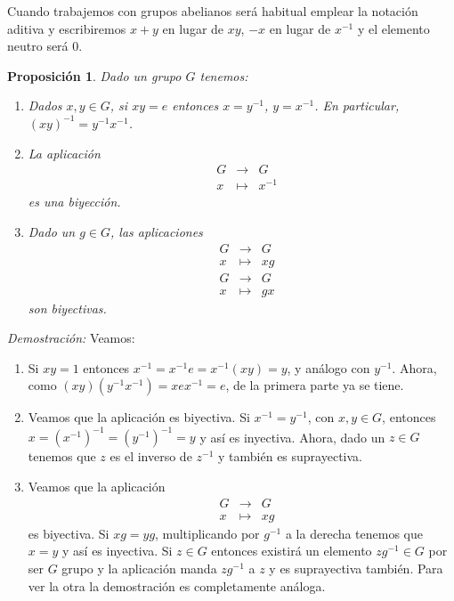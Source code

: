 \documentclass[12pt]{article}
\newtheorem{proposition}[theorem]{Proposición}
\begin{document}
Cuando trabajemos con grupos abelianos será habitual emplear la notación aditiva y escribiremos $x+y$ en lugar de $xy$, $-x$ en lugar de $x^{-1}$ y el elemento neutro será $0$.

\begin{proposition}\label{eq:primGrup} Dado un grupo $G$ tenemos:
\begin{enumerate}
\item Dados $x,y \in G$, si $xy = e$ entonces $x = y^{-1}$, $y = x^{-1}$. En particular, $(xy)^{-1} = y^{-1}x^{-1}$.
\item La aplicación $$\begin{array}{rccl}
&G&\longrightarrow &G\\
&x& \longmapsto &x^{-1}
\end{array}
$$ es una biyección.
\item Dado un $g \in G$, las aplicaciones $$\begin{array}{rccl}
&G&\longrightarrow &G\\
&x& \longmapsto &xg
\end{array}
$$
$$\begin{array}{rccl}
&G&\longrightarrow &G\\
&x& \longmapsto &gx
\end{array}
$$ son biyectivas.
\end{enumerate}
\end{proposition}
\emph{Demostración: }Veamos: \begin{enumerate}
\item Si $xy = 1$ entonces $x^{-1} = x^{-1}e= x^{-1}(xy) = y$, y análogo con $y^{-1}$. Ahora, como $(xy) (y^{-1}x^{-1})=xex^{-1} = e$, de la primera parte ya se tiene.
\item Veamos que la aplicación es biyectiva. Si $x^{-1} = y^{-1}$, con $x,y \in G$, entonces $x = (x^{-1})^{-1} = (y^{-1})^{-1}=y$ y así es inyectiva. Ahora, dado un $z \in G$ tenemos que $z$ es el inverso de $z^{-1}$ y también es suprayectiva.
\item Veamos que la aplicación $$\begin{array}{rccl}
&G&\longrightarrow &G\\
&x& \longmapsto &xg
\end{array}
$$ es biyectiva. Si $xg = yg$, multiplicando por $g^{-1}$ a la derecha tenemos que $x = y$ y así es inyectiva. Si $z \in G$ entonces existirá un elemento $zg^{-1} \in G$ por ser $G$ grupo y la aplicación manda $zg^{-1}$ a $z$ y es suprayectiva también. Para ver la otra la demostración es completamente análoga.
\end{enumerate}
\end{document}
